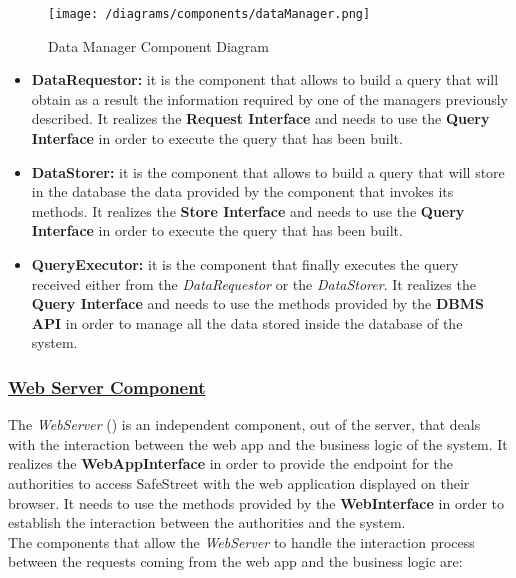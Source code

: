 			\begin{figure}[ht]
				\centering
				\texttt{[image: /diagrams/components/dataManager.png]}
				\caption{\label{fig:dataManagerComp} Data Manager Component Diagram}
			\end{figure}
		
			\begin{itemize}
				\item \textbf{DataRequestor:} it is the component that allows to build a query that will obtain as a result the information required by one of the managers previously described. It realizes the \textbf{Request Interface} and needs to use the \textbf{Query Interface} in order to execute the query that has been built.
				
				\item \textbf{DataStorer:} it is the component that allows to build a query that will store in the database the data provided by the component that invokes its methods. It realizes the \textbf{Store Interface} and needs to use the \textbf{Query Interface} in order to execute the query that has been built.
				
				\item \textbf{QueryExecutor:} it is the component that finally executes the query received either from the \emph{DataRequestor} or the \emph{DataStorer}. It realizes the \textbf{Query Interface} and needs to use the methods provided by the \textbf{DBMS API} in order to manage all the data stored inside the database of the system.
			\end{itemize}
		
		\subsubsection[Web Server Component]{\hyperlink{toc}{Web Server Component}}
			\label{sec:webServerComponent}
			
			The \emph{WebServer} () is an independent component, out of the server, that deals with the interaction between the web app and the business logic of the system. It realizes the \textbf{WebAppInterface} in order to provide the endpoint for the authorities to access SafeStreet with the web application displayed on their browser. It needs to use the methods provided by the \textbf{WebInterface} in order to establish the interaction between the authorities and the system.\\
			
			The components that allow the \emph{WebServer} to handle the interaction process between the requests coming from the web app and the business logic are:
			
